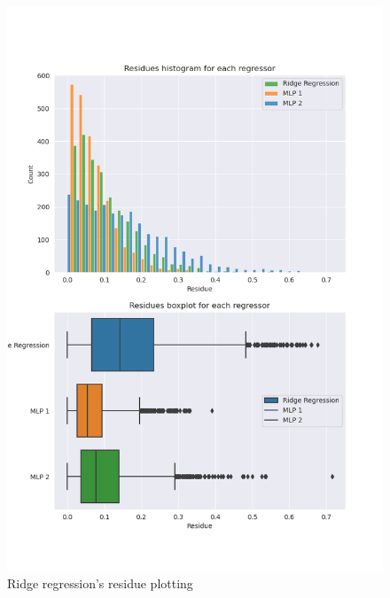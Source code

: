 \documentclass[12pt]{article}
\begin{document}
\begin{figure}[H]
  \centering
  \includegraphics[width=\textwidth]{../assets/residues.png}
  \caption{Ridge regression's residue plotting}
  \label{fig:residue-plotting}
\end{figure}
\end{document}
